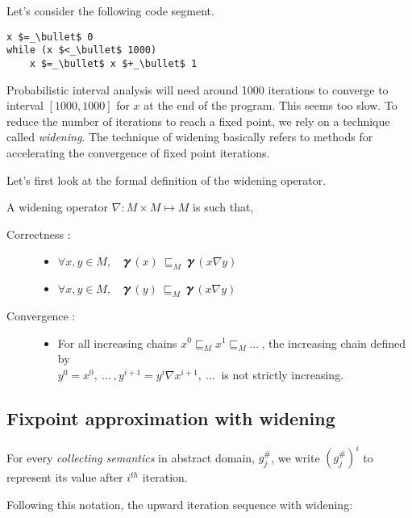 \documentclass[final,3p, review, times]{util/elsarticle}
\newcommand{\GAMMA}{\large\boldsymbol{\gamma}\normalsize}
\begin{document}
\noindent Let's consider the following code segment.

\begin{lstlisting}[mathescape]
x $=_\bullet$ 0
while (x $<_\bullet$ 1000)
    x $=_\bullet$ x $+_\bullet$ 1
\end{lstlisting}

\noindent Probabilistic interval analysis will need around 1000 iterations to converge to interval $[1000, 1000]$ for $x$ at the end of the program.
This seems too slow. To reduce the number of iterations to reach a fixed point, we rely on a technique called \textit{widening}. The technique of widening basically refers to methods for accelerating the convergence of fixed point iterations.

Let's first look at the formal definition of the widening operator.

\noindent A widening operator $\nabla: M\times M\mapsto M$ is such that,

\begin{description}
  \item[Correctness :] \hfill
	\begin{itemize}
	  \item $\forall x,y\in M,\quad$$\GAMMA$$(x)\ \sqsubseteq_M\ $$\GAMMA$$(x\nabla y)$
	  \item $\forall x,y\in M,\quad$$\GAMMA$$(y)\ \sqsubseteq_M\ $$\GAMMA$$(x\nabla y)$
	\end{itemize}
  \item[Convergence :] \hfill
	\begin{itemize}
	  \item For all increasing chains $x^0\sqsubseteq_M x^1\sqsubseteq_M\ldots\ $, the increasing chain defined by\\
	  $y^0=x^0,\ \ldots\ ,y^{i+1}=y^i\nabla x^{i+1},\ \ldots\ $ is not strictly increasing.
	\end{itemize}
\end{description}

\subsection{Fixpoint approximation with widening}

For every \textit{collecting semantics} in abstract domain, $g^\#_j$, we write $(g^\#_j)^i$ to represent its value after $i^{th}$ iteration.

Following this notation, the upward iteration sequence with widening\cite{cousot05}:
\end{document}
